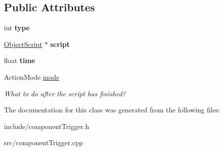 \subsection*{\-Public \-Attributes}
\begin{DoxyCompactItemize}
\item 
\hypertarget{classComponentTemplateTrigger_a718b13022b410afa20971927f36f714a}{
int {\bfseries type}}
\label{d7/d4e/classComponentTemplateTrigger_a718b13022b410afa20971927f36f714a}

\item 
\hypertarget{classComponentTemplateTrigger_a866938858b37d4ae51243db212179254}{
\hyperlink{classObjectScript}{\-Object\-Script} $\ast$ {\bfseries script}}
\label{d7/d4e/classComponentTemplateTrigger_a866938858b37d4ae51243db212179254}

\item 
\hypertarget{classComponentTemplateTrigger_aa26cd43c731f56914a97d50609dceeed}{
float {\bfseries time}}
\label{d7/d4e/classComponentTemplateTrigger_aa26cd43c731f56914a97d50609dceeed}

\item 
\hypertarget{classComponentTemplateTrigger_a8e881337503dfe80459890a04b3587b4}{
\-Action\-Mode \hyperlink{classComponentTemplateTrigger_a8e881337503dfe80459890a04b3587b4}{mode}}
\label{d7/d4e/classComponentTemplateTrigger_a8e881337503dfe80459890a04b3587b4}

\begin{DoxyCompactList}\small\item\em \-What to do after the script has finished? \end{DoxyCompactList}\end{DoxyCompactItemize}


\-The documentation for this class was generated from the following files\-:\begin{DoxyCompactItemize}
\item 
include/component\-Trigger.\-h\item 
src/component\-Trigger.\-cpp\end{DoxyCompactItemize}
